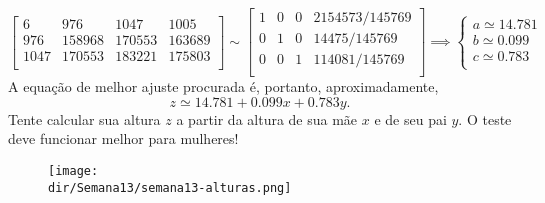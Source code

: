 \documentclass[../livro.tex]{subfiles}  %
\providecommand{\dir}{..}
\begin{document}
\begin{example}
\begin{equation}
\begin{bmatrix}
    6    & 976    & 1047   & 1005     \\
    976  & 158968 & 170553 & 163689   \\
    1047 & 170553 & 183221 & 175803   \\
  \end{bmatrix} \sim
  \begin{bmatrix}
    1 & 0 & 0  & 2154573/145769 \\
    0 & 1 & 0  & 14475/145769   \\
    0 & 0 & 1  & 114081/145769  \\
  \end{bmatrix} \implies
  \left\{
    \begin{array}{ll}
      a \simeq 14.781  \\
      b \simeq  0.099  \\
      c \simeq  0.783  \\
    \end{array}
  \right.
  \end{equation} A equação de melhor ajuste procurada é, portanto, aproximadamente,
  \begin{equation}
  z \simeq 14.781 + 0.099 x + 0.783 y.
  \end{equation} Tente calcular sua altura $z$ a partir da altura de sua mãe $x$ e de seu pai $y$. O teste deve funcionar melhor para mulheres!
  \begin{figure}[h!]
    \begin{center}
      \texttt{[image: \\dir/Semana13/semana13-alturas.png]}
    \end{center}
  \end{figure}
\end{example}
\end{document}
